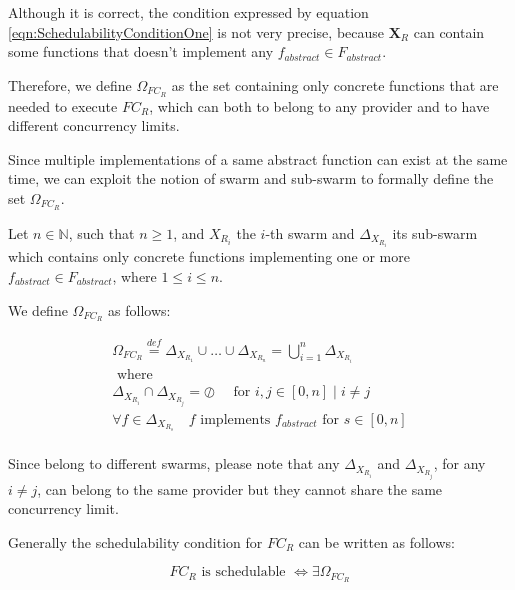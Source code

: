 \documentclass[10pt,a4paper]{article}
\newcommand{\mathDef}{\overset{\textit{def}}{=}}
\begin{document}
Although it is correct, the condition expressed by equation \ref{eqn:SchedulabilityConditionOne} is not very precise, because $\textbf{X}_R$ can contain some functions that doesn't implement any $f_{abstract} \in F_{abstract}$.

Therefore, we define $\Omega_{FC_R}$ as the set containing only concrete functions that are needed to execute $FC_R$, which can both to belong to any provider and to have different concurrency limits.

Since multiple implementations of a same abstract function can exist at the same time, we can exploit the notion of swarm and sub-swarm to formally define the set $\Omega_{FC_R}$.

Let $n \in \mathbb{N}$, such that $n \geq 1$, and $X_{R_i}$ the $i$-th swarm and $\Delta_{X_{R_i}}$ its sub-swarm which contains only concrete functions implementing one or more $f_{abstract} \in F_{abstract}$, where $1 \leq i \leq n$.

We define $\Omega_{FC_R}$ as follows: 

\begin{equation}
\begin{array}{c}
\Omega_{FC_R} \mathDef \Delta_{X_{R_1}} \cup  \ldots \cup \Delta_{X_{R_n}} = \bigcup_{i = 1}^n \Delta_{X_{R_i}} \\

\text{ where } \\	

\Delta_{X_{R_i}} \cap \Delta_{X_{R_j}} = \oslash \quad \text{ for } i,j \in \left[ 0, n \right] \mid i \neq j \\

\forall f \in \Delta_{X_{R_s}} \quad f \text{ implements } f_{abstract} \text{ for } s \in \left[ 0, n \right] \\

\end{array}
\end{equation}

Since belong to different swarms, please note that any $\Delta_{X_{R_i}}$ and $\Delta_{X_{R_j}}$, for any $i \neq j$, can belong to the same provider but they cannot share the same concurrency limit.

Generally the schedulability condition for $FC_R$ can be written as follows:

\begin{equation}
FC_R \text{ is schedulable } \Leftrightarrow \exists \Omega_{FC_R}
\end{equation}
\end{document}
